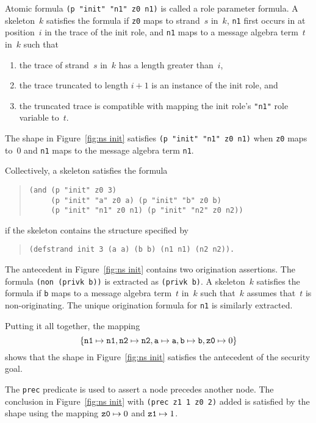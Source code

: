 Atomic formula \texttt{(p "init" "n1" z0 n1)} is called a role
parameter formula.  A skeleton~$k$ satisfies the formula if
\texttt{z0} maps to strand~$s$ in~$k$, \texttt{n1} first occurs in at
position~$i$ in the trace of the init role, and \texttt{n1} maps to a
message algebra term~$t$ in~$k$ such that
\begin{enumerate}
\item the trace of strand~$s$ in~$k$ has a length greater than~$i$,
\item the trace truncated to length $i+1$ is an instance of the
  init role, and
\item the truncated trace is compatible with mapping the init role's
  \texttt{"n1"} role variable to~$t$.
\end{enumerate}
The shape in Figure~\ref{fig:ns init} satisfies \texttt{(p "init" "n1"
  z0 n1)} when \texttt{z0} maps to~0 and \texttt{n1} maps to the
message algebra term \texttt{n1}.

Collectively, a skeleton satisfies the formula
\begin{quote}
\begin{verbatim}
(and (p "init" z0 3)
     (p "init" "a" z0 a) (p "init" "b" z0 b)
     (p "init" "n1" z0 n1) (p "init" "n2" z0 n2))
\end{verbatim}
\end{quote}
if the skeleton contains the structure specified by
\begin{quote}
\begin{verbatim}
(defstrand init 3 (a a) (b b) (n1 n1) (n2 n2)).
\end{verbatim}
\end{quote}

The antecedent in Figure~\ref{fig:ns init} contains two origination
assertions.  The formula \texttt{(non (privk b))} is extracted as
\texttt{(privk b)}.  A skeleton~$k$ satisfies the formula if
\texttt{b} maps to a message algebra term~$t$ in~$k$ such that~$k$
assumes that~$t$ is non-originating.  The unique origination formula for
\texttt{n1} is similarly extracted.

Putting it all together, the mapping
\[\{\mathtt{n1}\mapsto\mathtt{n1},
\mathtt{n2}\mapsto\mathtt{n2}, \mathtt{a}\mapsto\mathtt{a},
\mathtt{b}\mapsto\mathtt{b},\mbox{\tt z0}\mapsto0\}\] shows that
the shape in Figure~\ref{fig:ns init} satisfies the antecedent of the
security goal.

The \texttt{prec} predicate is used to assert a node precedes another
node.  The conclusion in Figure~\ref{fig:ns init} with \texttt{(prec
  z1 1 z0 2)} added is satisfied by the shape using the mapping
$\mbox{\tt z0}\mapsto0$ and $\mbox{\tt z1}\mapsto1$.

